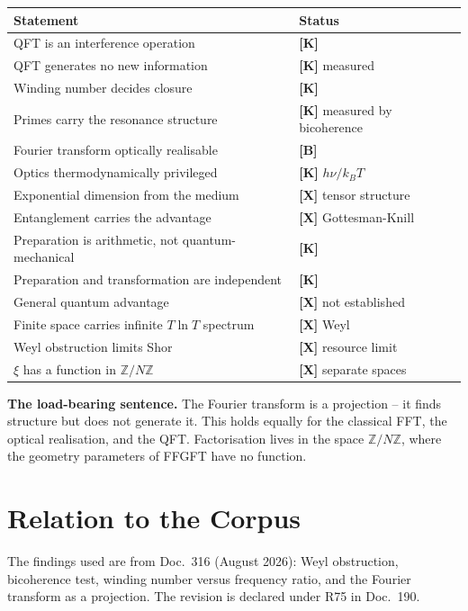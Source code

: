 \begin{center}
\begin{tabular}{ll}
\toprule
Statement & Status \\
\midrule
QFT is an interference operation & \textbf{[K]} \\
QFT generates no new information & \textbf{[K]} measured \\
Winding number decides closure & \textbf{[K]} \\
Primes carry the resonance structure & \textbf{[K]} measured by bicoherence \\
Fourier transform optically realisable & \textbf{[B]} \\
Optics thermodynamically privileged & \textbf{[K]} $h\nu/k_BT$ \\
Exponential dimension from the medium & \textbf{[X]} tensor structure \\
Entanglement carries the advantage & \textbf{[X]} Gottesman-Knill \\
Preparation is arithmetic, not quantum-mechanical & \textbf{[K]} \\
Preparation and transformation are independent & \textbf{[K]} \\
General quantum advantage & \textbf{[X]} not established \\
Finite space carries infinite $T\ln T$ spectrum & \textbf{[X]} Weyl \\
Weyl obstruction limits Shor & \textbf{[X]} resource limit \\
$\xi$ has a function in $\mathbb{Z}/N\mathbb{Z}$ & \textbf{[X]} separate spaces \\
\bottomrule
\end{tabular}
\end{center}

\textbf{The load-bearing sentence.} The Fourier transform is a projection -- it
finds structure but does not generate it. This holds equally for the classical
FFT, the optical realisation, and the QFT. Factorisation lives in the space
$\mathbb{Z}/N\mathbb{Z}$, where the geometry parameters of FFGFT have no
function.

\section{Relation to the Corpus}

The findings used are from Doc.~316 (August 2026): Weyl obstruction, bicoherence
test, winding number versus frequency ratio, and the Fourier transform as a
projection. The revision is declared under R75 in Doc.~190.

